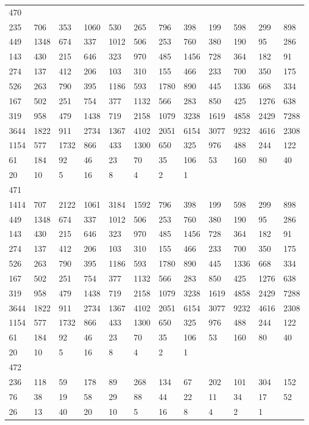 \begin{longtable}{llllllllllll}
470&&&&&&&&&&&\\
235& 706& 353& 1060& 530& 265& 796& 398& 199& 598& 299& 898\\
449& 1348& 674& 337& 1012& 506& 253& 760& 380& 190& 95& 286\\
143& 430& 215& 646& 323& 970& 485& 1456& 728& 364& 182& 91\\
274& 137& 412& 206& 103& 310& 155& 466& 233& 700& 350& 175\\
526& 263& 790& 395& 1186& 593& 1780& 890& 445& 1336& 668& 334\\
167& 502& 251& 754& 377& 1132& 566& 283& 850& 425& 1276& 638\\
319& 958& 479& 1438& 719& 2158& 1079& 3238& 1619& 4858& 2429& 7288\\
3644& 1822& 911& 2734& 1367& 4102& 2051& 6154& 3077& 9232& 4616& 2308\\
1154& 577& 1732& 866& 433& 1300& 650& 325& 976& 488& 244& 122\\
61& 184& 92& 46& 23& 70& 35& 106& 53& 160& 80& 40\\
20& 10& 5& 16& 8& 4& 2& 1& \\

471&&&&&&&&&&&\\
1414& 707& 2122& 1061& 3184& 1592& 796& 398& 199& 598& 299& 898\\
449& 1348& 674& 337& 1012& 506& 253& 760& 380& 190& 95& 286\\
143& 430& 215& 646& 323& 970& 485& 1456& 728& 364& 182& 91\\
274& 137& 412& 206& 103& 310& 155& 466& 233& 700& 350& 175\\
526& 263& 790& 395& 1186& 593& 1780& 890& 445& 1336& 668& 334\\
167& 502& 251& 754& 377& 1132& 566& 283& 850& 425& 1276& 638\\
319& 958& 479& 1438& 719& 2158& 1079& 3238& 1619& 4858& 2429& 7288\\
3644& 1822& 911& 2734& 1367& 4102& 2051& 6154& 3077& 9232& 4616& 2308\\
1154& 577& 1732& 866& 433& 1300& 650& 325& 976& 488& 244& 122\\
61& 184& 92& 46& 23& 70& 35& 106& 53& 160& 80& 40\\
20& 10& 5& 16& 8& 4& 2& 1& \\

472&&&&&&&&&&&\\
236& 118& 59& 178& 89& 268& 134& 67& 202& 101& 304& 152\\
76& 38& 19& 58& 29& 88& 44& 22& 11& 34& 17& 52\\
26& 13& 40& 20& 10& 5& 16& 8& 4& 2& 1& \\


\end{longtable}
